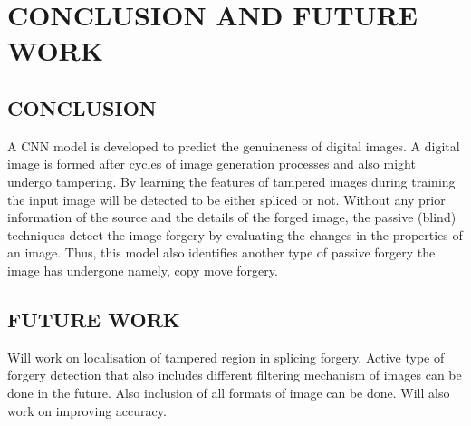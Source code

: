
\chapter{CONCLUSION AND FUTURE WORK} %
\newline
\section{CONCLUSION}
A CNN model is developed to predict the genuineness of digital images. A digital image is formed after cycles of image generation processes and also might undergo tampering. By learning the features of tampered images during training the input image will be detected to be either spliced or not. Without any prior information of the source and the details of the forged image, the passive (blind) techniques detect the image forgery by evaluating the changes in the properties of an image. Thus, this model also identifies another type of passive forgery the image has undergone namely, copy move forgery.


\section{FUTURE WORK}
Will work on localisation of tampered region in splicing forgery. Active type of forgery detection that also includes different filtering mechanism of images can be done in the future. Also inclusion of all formats of image can be done. Will also work on improving accuracy.

